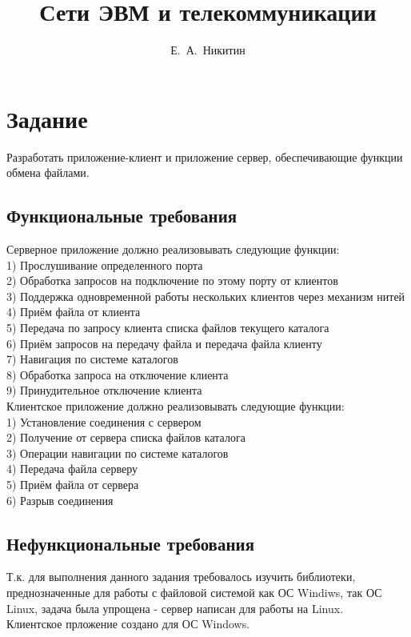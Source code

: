\documentclass[12pt,a4paper]{report}
\author{Е.~А.~Никитин}
\title{Сети ЭВМ и телекоммуникации}
\begin{document}
\maketitle
\chapter{Задание}
Разработать приложение-клиент и приложение сервер, обеспечивающие функции обмена файлами.
\section{Функциональные требования}
Серверное приложение должно реализовывать следующие функции:\\
1) Прослушивание определенного порта\\
2) Обработка запросов на подключение по этому порту от клиентов\\
3) Поддержка одновременной работы нескольких клиентов через механизм нитей\\
4) Приём файла от клиента\\
5) Передача по запросу клиента списка файлов текущего каталога\\
6) Приём запросов на передачу файла и передача файла клиенту\\
7) Навигация по системе каталогов\\
8) Обработка запроса на отключение клиента\\
9) Принудительное отключение клиента\\
Клиентское приложение должно реализовывать следующие функции:\\
1) Установление соединения с сервером\\
2) Получение от сервера списка файлов каталога\\
3) Операции навигации по системе каталогов\\
4) Передача файла серверу\\
5) Приём файла от сервера\\
6) Разрыв соединения\\
\section{Нефункциональные требования}
Т.к. для выполнения данного задания требовалось изучить библиотеки, преднозначенные для работы с файловой
системой как ОС Windiws, так ОС Linux, задача была упрощена - сервер написан для работы на Linux.\\
Клиентское прложение создано для ОС Windows.\\
\end{document}
